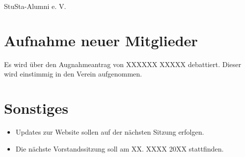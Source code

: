 \documentclass[a4paper,12pt]{article}
\begin{document}
\begin{Protokoll}{StuSta-Alumni e. V.}


\protokollKopf
\newpage

\section{Aufnahme neuer Mitglieder}
Es wird über den Augnahmeantrag von XXXXXX XXXXX debattiert. Dieser wird einstimmig in den Verein aufgenommen.


\section{Sonstiges}
\begin{itemize}
  \item Updates zur Website sollen auf der nächsten Sitzung erfolgen.
  \item Die nächste Vorstandssitzung soll am XX. XXXX 20XX stattfinden.
\end{itemize}


\end{Protokoll}
\end{document}
